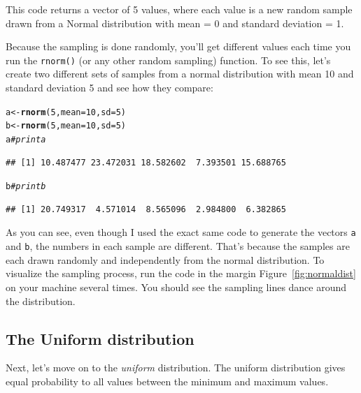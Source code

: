 \documentclass{tufte-book}\usepackage[]{graphicx}\usepackage[]{color}
\makeatletter
\newcommand{\hlnum}[1]{\textcolor[rgb]{0.686,0.059,0.569}{#1}}%
\newcommand{\hlcom}[1]{\textcolor[rgb]{0.678,0.584,0.686}{\textit{#1}}}%
\newcommand{\hlstd}[1]{\textcolor[rgb]{0.345,0.345,0.345}{#1}}%
\newcommand{\hlkwb}[1]{\textcolor[rgb]{0.69,0.353,0.396}{#1}}%
\newcommand{\hlkwc}[1]{\textcolor[rgb]{0.333,0.667,0.333}{#1}}%
\newcommand{\hlkwd}[1]{\textcolor[rgb]{0.737,0.353,0.396}{\textbf{#1}}}%
\newenvironment{kframe}{%
 \def\at@end@of@kframe{}%
 \ifinner\ifhmode%
  \def\at@end@of@kframe{\end{minipage}}%
  \begin{minipage}{\columnwidth}%
 \fi\fi%
 \def\FrameCommand##1{\hskip\@totalleftmargin \hskip-\fboxsep
 \colorbox{shadecolor}{##1}\hskip-\fboxsep
     \hskip-\linewidth \hskip-\@totalleftmargin \hskip\columnwidth}%
 \MakeFramed {\advance\hsize-\width
   \@totalleftmargin\z@ \linewidth\hsize
   \@setminipage}}%
 {\par\unskip\endMakeFramed%
 \at@end@of@kframe}
\newenvironment{knitrout}{}{} %
\makeatother
\begin{document}
This code returns a vector of 5 values, where each value is a new random sample drawn from a Normal distribution with mean = 0 and standard deviation = 1.

Because the sampling is done randomly, you'll get different values each time you run the \texttt{rnorm()} (or any other random sampling) function. To see this, let's create two different sets of samples from a normal distribution with mean 10 and standard deviation 5 and see how they compare:

\begin{knitrout}
\color{fgcolor}\begin{kframe}
\begin{alltt}
\hlstd{a} \hlkwb{<-} \hlkwd{rnorm}\hlstd{(}\hlnum{5}\hlstd{,} \hlkwc{mean} \hlstd{=} \hlnum{10}\hlstd{,} \hlkwc{sd} \hlstd{=} \hlnum{5}\hlstd{)}
\hlstd{b} \hlkwb{<-} \hlkwd{rnorm}\hlstd{(}\hlnum{5}\hlstd{,} \hlkwc{mean} \hlstd{=} \hlnum{10}\hlstd{,} \hlkwc{sd} \hlstd{=} \hlnum{5}\hlstd{)}
\hlstd{a} \hlcom{# print a}
\end{alltt}
\begin{verbatim}
## [1] 10.487477 23.472031 18.582602  7.393501 15.688765
\end{verbatim}
\begin{alltt}
\hlstd{b} \hlcom{# print b}
\end{alltt}
\begin{verbatim}
## [1] 20.749317  4.571014  8.565096  2.984800  6.382865
\end{verbatim}
\end{kframe}
\end{knitrout}


As you can see, even though I used the exact same code to generate the vectors \texttt{a} and \texttt{b}, the numbers in each sample are different. That's because the samples are each drawn randomly and independently from the normal distribution. To visualize the sampling process, run the code in the margin Figure~\ref{fig:normaldist} on your machine several times. You should see the sampling lines dance around the distribution. 

\subsection{The Uniform distribution}

Next, let's move on to the \textit{uniform} distribution. The uniform distribution gives equal probability to all values between the minimum and maximum values.
\end{document}
